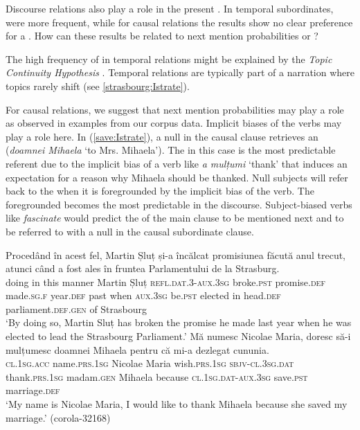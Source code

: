 \documentclass[output=paper,colorlinks,citecolor=brown]{langscibook}
\begin{document}
Discourse relations also play a role in the present . In temporal subordinates,  were more frequent, while for causal relations the results show no clear preference for a . How can these results be related to next mention probabilities or ? 

The high frequency of  in temporal relations might be explained by the \textit{Topic Continuity Hypothesis} \citep{givon1983topic, runner2016information}. Temporal relations are typically part of a narration where topics rarely shift (see \ref{strasbourg:Istrate}). 

For causal relations, we suggest that next mention probabilities may play a role as observed in examples from our corpus data. Implicit  biases of the verbs may play a role here. In (\ref{save:Istrate}), a null  in the causal clause retrieves an   (\textit{doamnei Mihaela} `to Mrs. Mihaela'). The  in this case is the most predictable referent due to the implicit  bias of a verb like \textit{a mulțumi} `thank' that induces an expectation for a reason why Mihaela should be thanked. 
Null subjects will  refer back to the   when it is foregrounded by the implicit  bias of the verb. The foregrounded  becomes the most predictable in the discourse. Subject-biased verbs like \textit{fascinate} would predict the  of the main clause to be mentioned next and to be referred to with a null  in the causal subordinate clause.

\ea \ea \label{strasbourg:Istrate}
\gll Procedând în acest fel, Martin Șluț și-a încălcat promisiunea făcută anul trecut, {atunci când} a fost ales în fruntea Parlamentului {de la} Strasburg.\\
doing in this manner Martin Șluț \textsc{refl.dat.3-aux.3sg} broke.\textsc{pst} promise.\textsc{def} made.\textsc{sg.f} year.\textsc{def} past {when} \textsc{aux.3sg} be.\textsc{pst} elected in head.\textsc{def} parliament.\textsc{def.gen} of Strasbourg \\
\glt`By doing so, Martin Sluț has broken the promise he made last year when he was elected to lead the Strasbourg Parliament.'
\ex \label{save:Istrate}
\gll  Mă numesc Nicolae Maria, doresc să-i mulțumesc doamnei Mihaela {pentru că} mi-a dezlegat cununia. \\
\textsc{cl.1sg.acc} name.\textsc{prs.1sg} Nicolae Maria wish.\textsc{prs.1sg} \textsc{sbjv-cl.3sg.dat} thank.\textsc{prs.1sg} madam.\textsc{gen} Mihaela because \textsc{cl.1sg.dat-aux.3sg} save.\textsc{pst} marriage.\textsc{def}\\
\glt `My name is Nicolae Maria, I would like to thank Mihaela because she saved my marriage.' (corola-32168)
\z
\z
\end{document}
